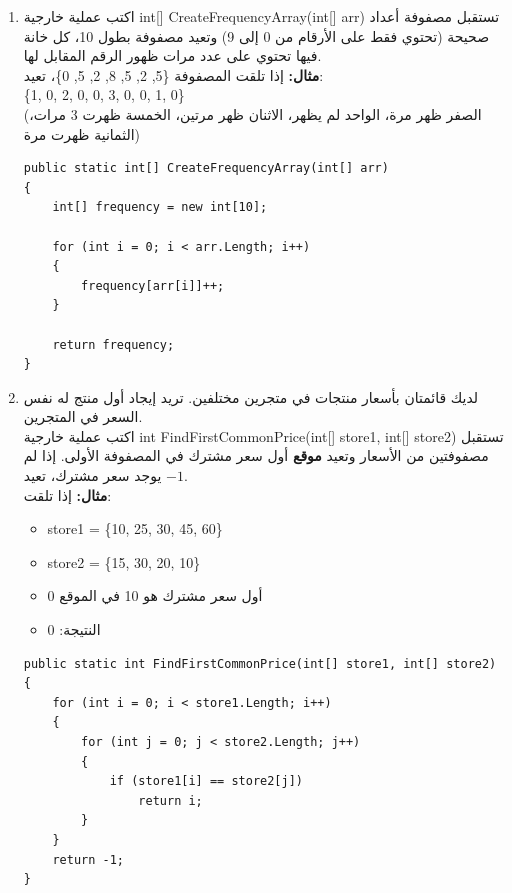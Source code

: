 \documentclass[14pt]{extarticle}
\begin{document}
\begin{enumerate}[resume, itemsep=2em]
    \item
    اكتب عملية خارجية \textenglish{int[] CreateFrequencyArray(int[] arr)} تستقبل مصفوفة أعداد صحيحة (تحتوي فقط على الأرقام من 0 إلى 9) وتعيد مصفوفة بطول 10، كل خانة فيها تحتوي على عدد مرات ظهور الرقم المقابل لها.\\
    \textbf{مثال:} إذا تلقت المصفوفة \textenglish{\{5, 2, 5, 8, 2, 5, 0\}}، تعيد:\\
    \textenglish{\{1, 0, 2, 0, 0, 3, 0, 0, 1, 0\}}\\
    (الصفر ظهر مرة، الواحد لم يظهر، الاثنان ظهر مرتين، الخمسة ظهرت 3 مرات، الثمانية ظهرت مرة)
    \ifwithsols
    \begin{boxSolution}
    \begin{english}
    \begin{verbatim}
public static int[] CreateFrequencyArray(int[] arr)
{
    int[] frequency = new int[10];

    for (int i = 0; i < arr.Length; i++)
    {
        frequency[arr[i]]++;
    }

    return frequency;
}
    \end{verbatim}
    \end{english}
    \end{boxSolution}
    \fi

    \item
    لديك قائمتان بأسعار منتجات في متجرين مختلفين. تريد إيجاد أول منتج له نفس السعر في المتجرين.\\
    اكتب عملية خارجية \textenglish{int FindFirstCommonPrice(int[] store1, int[] store2)} تستقبل مصفوفتين من الأسعار وتعيد \textbf{موقع} أول سعر مشترك في المصفوفة الأولى. إذا لم يوجد سعر مشترك، تعيد $-1$.\\
    \textbf{مثال:} إذا تلقت:
    \begin{itemize}
        \item \textenglish{store1 = \{10, 25, 30, 45, 60\}}
        \item \textenglish{store2 = \{15, 30, 20, 10\}}
        \item أول سعر مشترك هو 10 في الموقع 0
        \item النتيجة: 0
    \end{itemize}
    \ifwithsols
    \begin{boxSolution}
    \begin{english}
    \begin{verbatim}
public static int FindFirstCommonPrice(int[] store1, int[] store2)
{
    for (int i = 0; i < store1.Length; i++)
    {
        for (int j = 0; j < store2.Length; j++)
        {
            if (store1[i] == store2[j])
                return i;
        }
    }
    return -1;
}
    \end{verbatim}
    \end{english}
    \end{boxSolution}
    \fi


\end{enumerate}
\end{document}
